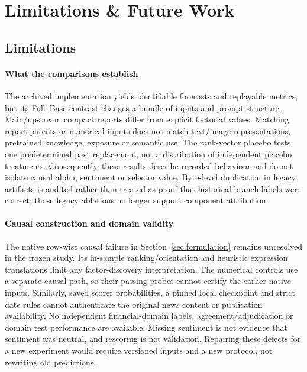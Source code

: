 \section{Limitations \& Future Work}
\label{sec:limitations}

\subsection{Limitations}
\paragraph{What the comparisons establish}
The archived implementation yields identifiable forecasts and replayable metrics, but its Full--Base contrast changes a bundle of inputs and prompt structure. Main/upstream compact reports differ from explicit factorial values. Matching report parents or numerical inputs does not match text/image representations, pretrained knowledge, exposure or semantic use. The rank-vector placebo tests one predetermined past replacement, not a distribution of independent placebo treatments. Consequently, these results describe recorded behaviour and do not isolate causal alpha, sentiment or selector value. Byte-level duplication in legacy artifacts is audited rather than treated as proof that historical branch labels were correct; those legacy ablations no longer support component attribution.

\paragraph{Causal construction and domain validity}
The native row-wise causal failure in Section~\ref{sec:formulation} remains unresolved in the frozen study. Its in-sample ranking/orientation and heuristic expression translations limit any factor-discovery interpretation. The numerical controls use a separate causal path, so their passing probes cannot certify the earlier native inputs. Similarly, saved scorer probabilities, a pinned local checkpoint and strict date rules cannot authenticate the original news content or publication availability. No independent financial-domain labels, agreement/adjudication or domain test performance are available. Missing sentiment is not evidence that sentiment was neutral, and rescoring is not validation. Repairing these defects for a new experiment would require versioned inputs and a new protocol, not rewriting old predictions.

